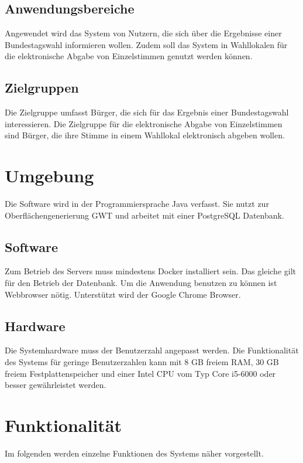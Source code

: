 \documentclass[a4paper]{scrreprt}
\begin{document}
\subsection{Anwendungsbereiche}
Angewendet wird das System von Nutzern, die sich über die Ergebnisse einer Bundestagswahl informieren wollen. Zudem soll das System in Wahllokalen für die elektronische Abgabe von Einzelstimmen genutzt werden können.
 
\subsection{Zielgruppen}
Die Zielgruppe umfasst Bürger, die sich für das Ergebnis einer Bundestagswahl interessieren. Die Zielgruppe für die elektronische Abgabe von Einzelstimmen sind Bürger, die ihre Stimme in einem Wahllokal elektronisch abgeben wollen. 

\section{Umgebung}
Die Software wird in der Programmiersprache Java verfasst. Sie nutzt zur Oberflächengenerierung GWT und arbeitet mit einer PostgreSQL Datenbank.
 
\subsection{Software}
Zum Betrieb des Servers muss mindestens Docker installiert sein.
Das gleiche gilt für den Betrieb der Datenbank.
Um die Anwendung benutzen zu können ist Webbrowser nötig.
Unterstützt wird der Google Chrome Browser.
 
\subsection{Hardware}
Die Systemhardware muss der Benutzerzahl angepasst werden.
Die Funktionalität des Systems für geringe Benutzerzahlen kann mit 8 GB freiem RAM, 30 GB freiem Festplattenspeicher und einer Intel CPU vom Typ Core i5-6000 oder besser gewährleistet werden.
 

\section{Funktionalität}
Im folgenden werden einzelne Funktionen des Systems näher vorgestellt. 
 
\end{document}
